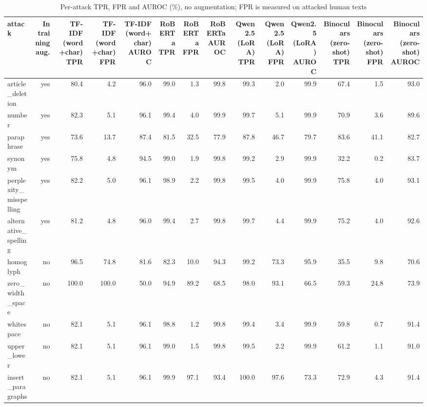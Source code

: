 \begin{table}[!t]
\centering
\caption{Per-attack TPR, FPR and AUROC (\%), no augmentation; FPR is measured on attacked human texts}
\label{tab:per_attack}
\footnotesize
\begin{tabular}{lrrrrrrrrrrrrr}
\toprule
\textbf{attack} & \textbf{In training aug.} & \textbf{TF-IDF (word+char) TPR} & \textbf{TF-IDF (word+char) FPR} & \textbf{TF-IDF (word+char) AUROC} & \textbf{RoBERTa TPR} & \textbf{RoBERTa FPR} & \textbf{RoBERTa AUROC} & \textbf{Qwen2.5 (LoRA) TPR} & \textbf{Qwen2.5 (LoRA) FPR} & \textbf{Qwen2.5 (LoRA) AUROC} & \textbf{Binoculars (zero-shot) TPR} & \textbf{Binoculars (zero-shot) FPR} & \textbf{Binoculars (zero-shot) AUROC} \\
\midrule
article\_deletion & yes & 80.4 & 4.2 & 96.0 & 99.0 & 1.3 & 99.8 & 99.3 & 2.0 & 99.9 & 67.4 & 1.5 & 93.0 \\
number & yes & 82.3 & 5.1 & 96.1 & 99.4 & 4.0 & 99.9 & 99.7 & 5.1 & 99.9 & 70.9 & 3.6 & 89.6 \\
paraphrase & yes & 73.6 & 13.7 & 87.4 & 81.5 & 32.5 & 77.9 & 87.8 & 46.7 & 79.7 & 83.6 & 41.1 & 82.7 \\
synonym & yes & 75.8 & 4.8 & 94.5 & 99.0 & 1.9 & 99.8 & 99.2 & 2.9 & 99.9 & 32.2 & 0.2 & 83.7 \\
perplexity\_misspelling & yes & 82.2 & 5.0 & 96.1 & 98.9 & 2.2 & 99.8 & 99.5 & 4.0 & 99.9 & 75.8 & 4.0 & 93.1 \\
alternative\_spelling & yes & 81.2 & 4.8 & 96.0 & 99.4 & 2.7 & 99.8 & 99.7 & 4.4 & 99.9 & 75.2 & 4.0 & 92.6 \\
homoglyph & no & 96.5 & 74.8 & 81.6 & 82.3 & 10.0 & 94.3 & 99.2 & 73.3 & 95.9 & 35.5 & 9.8 & 70.6 \\
zero\_width\_space & no & 100.0 & 100.0 & 50.0 & 94.9 & 89.2 & 68.5 & 98.0 & 93.1 & 66.5 & 59.3 & 24.8 & 73.9 \\
whitespace & no & 82.1 & 5.1 & 96.1 & 98.8 & 1.2 & 99.8 & 99.4 & 3.4 & 99.9 & 59.8 & 0.7 & 91.4 \\
upper\_lower & no & 82.1 & 5.1 & 96.1 & 99.0 & 1.5 & 99.8 & 99.5 & 2.2 & 99.9 & 61.2 & 1.1 & 91.0 \\
insert\_paragraphs & no & 82.1 & 5.1 & 96.1 & 99.9 & 97.1 & 93.4 & 100.0 & 97.6 & 73.3 & 72.9 & 4.3 & 91.4 \\
\bottomrule
\end{tabular}
\end{table}
